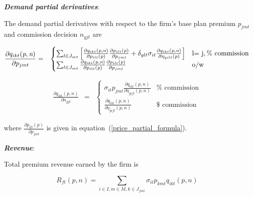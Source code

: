 \documentclass[12pt]{article}
\begin{document}
\noindent \textit{\bf Demand partial derivatives}:

\noindent The demand partial derivatives with respect to the firm's base plan premium $p_{jmt}$ and commission decision $n_{gjt}$ are 	
	
\vspace{-0.4in}		
		
		\begin{eqnarray*}
		\frac{\partial q_{ikt}(\textit{p},\textit{n})}{\partial p_{jmt}} &=& \begin{cases} \sum_{l \in J_{mt}} \left[ \frac{ \partial q_{ikt}(\textit{p},\textit{n})}{\partial p_{ilt}(\textit{p})}\frac{ \partial p_{ilt}(\textit{p})}{\partial p_{jmt}} +  \delta_{glt} \sigma_{it} \frac{ \partial q_{ikt}(\textit{p},\textit{n})}{\partial \eta_{gilt}(\textit{p})}  \right] & $l= j$, \mathrm{\% \,\, commission} \\
		\sum_{l \in J_{mt}}  \frac{ \partial q_{ikt}(\textit{p},\textit{n})}{\partial p_{ilt}(\textit{p})}\frac{ \partial p_{ilt}(\textit{p})}{\partial p_{jmt}}  & \mathrm{o/w} 
		\end{cases}
		\end{eqnarray*}
		
		
	\vspace{-0.4in}
	\singlespacing	

		 \begin{eqnarray*}
	\frac{\partial q_{ikt}(\textit{p},\textit{n})}{\partial n_{gjt}} &=& \begin{cases} 
		\sigma_{it} p_{jmt} \frac{\partial q_{ikt}(\textit{p},\textit{n})}{\partial \eta_{gijt}(\textit{p},\textit{n})}  & \mathrm{\% \,\, commission} \\		
		\frac{\partial q_{ikt}(\textit{p},\textit{n})}{\partial \eta_{gijt}(\textit{p},\textit{n})} & \mathrm{\$ \,\, commission}
   \end{cases}
	\end{eqnarray*}
				
		\doublespacing
				
		
	\noindent	where $\frac{\partial p_{ilt}(\textit{p})}{\partial p_{jmt}}$ is given in equation~(\ref{price_partial_formula}).
	
		
\noindent \textit{\bf Revenue}:
	
\noindent Total premium revenue earned by the firm is 		
	
		\vspace{-0.3in}		
	
		$$
		R_{ft}(\textit{p},\textit{n}) = \sum_{i \in I, m \in M, k \in J_{fmt}} \sigma_{it} p_{kmt} q_{ikt}(\textit{p},\textit{n})
		$$	
	
\end{document}
